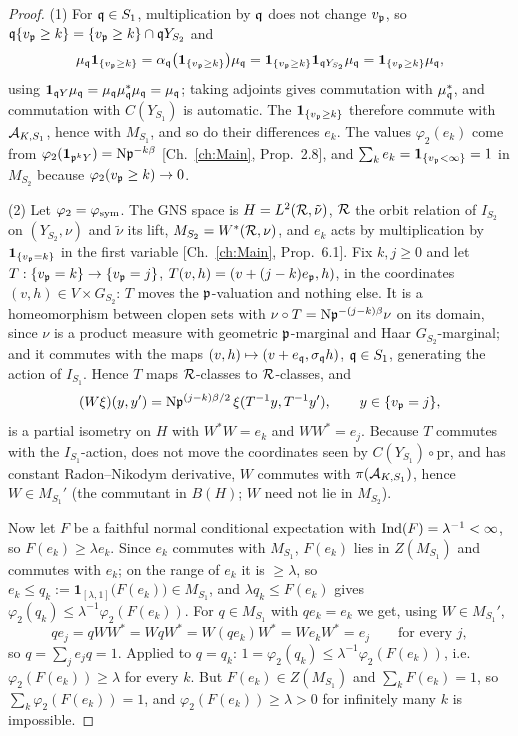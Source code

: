 \begin{proof}
(1) For $\mathfrak{q}\in S_1$, multiplication by $\mathfrak{q}$ does not change $v_{\mathfrak{p}}$, so
$\mathfrak{q}\{v_{\mathfrak{p}}\ge k\}=\{v_{\mathfrak{p}}\ge k\}\cap\mathfrak{q} Y_{S_2}$ and
\[
\mu_{\mathfrak{q}}\mathbf 1_{\{v_{\mathfrak{p}}\ge k\}}=\alpha_{\mathfrak{q}}\bigl(\mathbf 1_{\{v_{\mathfrak{p}}\ge k\}}\bigr)\mu_{\mathfrak{q}}
=\mathbf 1_{\{v_{\mathfrak{p}}\ge k\}}\mathbf 1_{\mathfrak{q} Y_{S_2}}\mu_{\mathfrak{q}}=\mathbf 1_{\{v_{\mathfrak{p}}\ge k\}}\mu_{\mathfrak{q}} ,
\]
using $\mathbf 1_{\mathfrak{q} Y}\mu_{\mathfrak{q}}=\mu_{\mathfrak{q}}\mu_{\mathfrak{q}}^*\mu_{\mathfrak{q}}=\mu_{\mathfrak{q}}$; taking adjoints gives
commutation with $\mu_{\mathfrak{q}}^*$, and commutation with $C(Y_{S_1})$ is automatic. The
$\mathbf 1_{\{v_{\mathfrak{p}}\ge k\}}$ therefore commute with $\mathcal{A}_{K,S_1}$, hence with $M_{S_1}$, and so
do their differences $e_k$. The values $\varphi_2(e_k)$ come from
$\varphi_2(\mathbf 1_{\mathfrak{p}^kY})=\mathrm{N}\mathfrak{p}^{-k\beta}$ [Ch.~\ref{ch:Main}, Prop.~2.8], and
$\sum_ke_k=\mathbf 1_{\{v_{\mathfrak{p}}<\infty\}}=1$ in $M_{S_2}$ because $\varphi_2(v_{\mathfrak{p}}\ge k)\to0$.

(2) Let $\varphi_2=\varphi_{\mathrm{sym}}$. The GNS space is $H=L^2(\mathcal{R},\tilde\nu)$, $\mathcal{R}$ the orbit
relation of $I_{S_2}$ on $(Y_{S_2},\nu)$ and $\tilde\nu$ its lift, $M_{S_2}=W^*(\mathcal{R},\nu)$,
and $e_k$ acts by multiplication by $\mathbf 1_{\{v_{\mathfrak{p}}=k\}}$ in the first variable
[Ch.~\ref{ch:Main}, Prop.~6.1]. Fix $k,j\ge0$ and let $T:\{v_{\mathfrak{p}}=k\}\to\{v_{\mathfrak{p}}=j\}$,
$T(v,h)=(v+(j-k)e_{\mathfrak{p}},h)$, in the coordinates $(v,h)\in V\times G_{S_2}$: $T$ moves the
$\mathfrak{p}$-valuation and nothing else. It is a homeomorphism between clopen sets with
$\nu\circ T=\mathrm{N}\mathfrak{p}^{-(j-k)\beta}\nu$ on its domain, since $\nu$ is a product measure with
geometric $\mathfrak{p}$-marginal and Haar $G_{S_2}$-marginal; and it commutes with the maps
$(v,h)\mapsto(v+e_{\mathfrak{q}},\sigma_{\mathfrak{q}} h)$, $\mathfrak{q}\in S_1$, generating the action of $I_{S_1}$. Hence
$T$ maps $\mathcal{R}$-classes to $\mathcal{R}$-classes, and
\[
(W\xi)(y,y')=\mathrm{N}\mathfrak{p}^{(j-k)\beta/2}\,\xi(T^{-1}y,T^{-1}y'),\qquad y\in\{v_{\mathfrak{p}}=j\},
\]
is a partial isometry on $H$ with $W^*W=e_k$ and $WW^*=e_j$. Because $T$ commutes with the
$I_{S_1}$-action, does not move the coordinates seen by $C(Y_{S_1})\circ\mathrm{pr}$, and
has constant Radon--Nikodym derivative, $W$ commutes with $\pi(\mathcal{A}_{K,S_1})$, hence
$W\in M_{S_1}'$ (the commutant in $B(H)$; $W$ need not lie in $M_{S_2}$).

Now let $F$ be a faithful normal conditional expectation with $\operatorname{Ind}(F)=\lambda^{-1}<\infty$,
so $F(e_k)\ge\lambda e_k$. Since $e_k$ commutes with $M_{S_1}$, $F(e_k)$ lies in
$Z(M_{S_1})$ and commutes with $e_k$; on the range of $e_k$ it is $\ge\lambda$, so
$e_k\le q_k:=\mathbf 1_{[\lambda,1]}\bigl(F(e_k)\bigr)\in M_{S_1}$, and
$\lambda q_k\le F(e_k)$ gives $\varphi_2(q_k)\le\lambda^{-1}\varphi_2(F(e_k))$. For $q\in M_{S_1}$
with $qe_k=e_k$ we get, using $W\in M_{S_1}'$,
\[
qe_j=qWW^*=WqW^*=W(qe_k)W^*=We_kW^*=e_j\qquad\text{for every }j,
\]
so $q=\sum_je_jq=1$. Applied to $q=q_k$: $1=\varphi_2(q_k)\le\lambda^{-1}\varphi_2(F(e_k))$,
i.e.\ $\varphi_2(F(e_k))\ge\lambda$ for every $k$. But $F(e_k)\in Z(M_{S_1})$ and
$\sum_kF(e_k)=1$, so $\sum_k\varphi_2(F(e_k))=1$, and $\varphi_2(F(e_k))\ge\lambda>0$ for
infinitely many $k$ is impossible.
\end{proof}


